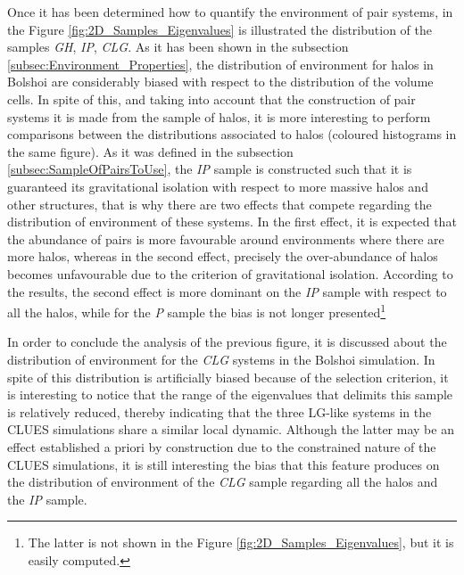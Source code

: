 Once it has been determined how to quantify the environment of pair 
systems, in the Figure \ref{fig:2D_Samples_Eigenvalues} is illustrated the
distribution of the samples \textit{GH}, \textit{IP}, \textit{CLG}. As it
has been shown in the subsection \ref{subsec:Environment_Properties}, the
distribution of environment for halos in Bolshoi are considerably biased
with respect to the distribution of the volume cells. In spite of this,
and taking into account that the construction of pair systems it is made
from the sample of halos, it is more interesting to perform comparisons
between the distributions associated to halos (coloured histograms in
the same figure). As it was defined in the subsection 
\ref{subsec:SampleOfPairsToUse}, the \textit{IP} sample is constructed 
such that it is guaranteed its gravitational isolation with respect to
more massive halos and other structures, that is why there are two effects
that compete regarding the distribution of environment of these systems.
In the first effect, it is expected that the abundance of pairs is more
favourable around environments where there are more halos, whereas in the 
second effect, precisely the over-abundance of halos becomes unfavourable
due to the criterion of gravitational isolation. According to the results, 
the second effect is more dominant on the \textit{IP} sample with respect
to all the halos, while for the \textit{P} sample the bias is not longer
presented\footnote{ The latter is not shown in the Figure 
\ref{fig:2D_Samples_Eigenvalues}, but it is easily computed.}
 

In order to conclude the analysis of the previous figure, it is discussed 
about the distribution of environment for the \textit{CLG} systems in the
Bolshoi simulation. In spite of this distribution is artificially biased 
because of the selection criterion, it is interesting to notice that the
range of the eigenvalues that delimits this sample is relatively reduced, 
thereby indicating that the three LG-like systems in the CLUES simulations
share a similar local dynamic. Although the latter may be an effect 
established a priori by construction due to the constrained nature of the
CLUES simulations, it is still interesting the bias that this feature 
produces on the distribution of environment of the \textit{CLG} sample
regarding all the halos and the \textit{IP} sample.


